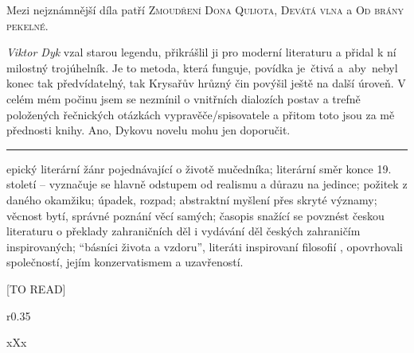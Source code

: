 \documentclass{extarticle} %
\begin{document}
\noindent 
Mezi nejznámnější díla patří \textsc{Zmoudření Dona Quijota}, \textsc{Devátá vlna} a \textsc{Od brány pekelné}.






\noindent 
\textit{Viktor Dyk} vzal starou legendu, přikrášlil ji pro moderní literaturu a přidal k ní milostný trojúhelník.
Je to metoda, která funguje, povídka je~čtivá a~aby~nebyl konec tak předvídatelný, tak Krysařův hrůzný čin povýšil ještě na další úroveň.
V celém mém počinu jsem se nezmínil o vnitřních dialozích postav a trefně položených řečnických otázkách vypravěče/spisovatele a přitom toto jsou za mě přednosti knihy.
Ano, Dykovu novelu mohu jen doporučit.

\vfill

\noindent\begin{minipage}{\textwidth}
    {\textcolor{\wpagecolor}{\rule{\linewidth}{0.4pt}}
    \footnotesize
     epický literární žánr pojednávající o životě mučedníka;
     literární směr konce 19. století -- vyznačuje se hlavně odstupem od realismu a důrazu na jedince;
     požitek z daného okamžiku;
     úpadek, rozpad;
     abstraktní myšlení přes skryté významy;
     věcnost bytí, správné poznání věcí samých;
     časopis snažící se povznést českou literaturu o překlady zahraničních děl i vydávání děl českých zahraničím inspirovaných;
     \enquote{básníci života a vzdoru}, literáti inspirovaní filosofií , opovrhovali společností, jejím konzervatismem a uzavřeností.
    }
\end{minipage}

\newpage


\changefontsize{8pt}

[TO READ]

\noindent\begin{wrapfigure}{r}{0.35\textwidth}
\tiny

\setlength{\parindent}{3pt}
xXx
\end{wrapfigure}
\end{document}
